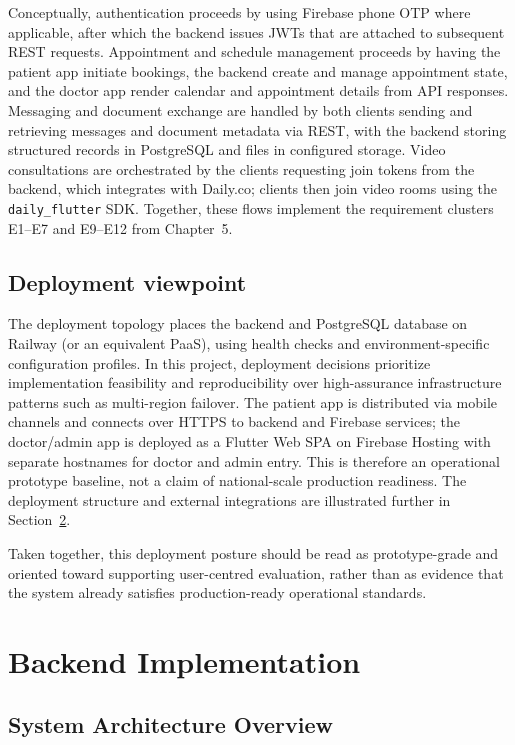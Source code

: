 \documentclass[11pt,a4paper,twoside,openany,headings=normal]{scrreprt}
\begin{document}
Conceptually, authentication proceeds by using Firebase phone OTP where applicable, after which the backend issues JWTs that are attached to subsequent REST requests. Appointment and schedule management proceeds by having the patient app initiate bookings, the backend create and manage appointment state, and the doctor app render calendar and appointment details from API responses. Messaging and document exchange are handled by both clients sending and retrieving messages and document metadata via REST, with the backend storing structured records in PostgreSQL and files in configured storage. Video consultations are orchestrated by the clients requesting join tokens from the backend, which integrates with Daily.co; clients then join video rooms using the \texttt{daily\_flutter} SDK. Together, these flows implement the requirement clusters E1--E7 and E9--E12 from Chapter~5.

\section{Deployment viewpoint}

The deployment topology places the backend and PostgreSQL database on Railway (or an equivalent PaaS), using health checks and environment-specific configuration profiles. In this project, deployment decisions prioritize implementation feasibility and reproducibility over high-assurance infrastructure patterns such as multi-region failover. The patient app is distributed via mobile channels and connects over HTTPS to backend and Firebase services; the doctor/admin app is deployed as a Flutter Web SPA on Firebase Hosting with separate hostnames for doctor and admin entry. This is therefore an operational prototype baseline, not a claim of national-scale production readiness. The deployment structure and external integrations are illustrated further in Section~\ref{ch:backend-implementation}.

Taken together, this deployment posture should be read as prototype-grade and oriented toward supporting user-centred evaluation, rather than as evidence that the system already satisfies production-ready operational standards.

\chapter{Backend Implementation}
\label{ch:backend-implementation}

\section{System Architecture Overview}
\end{document}
